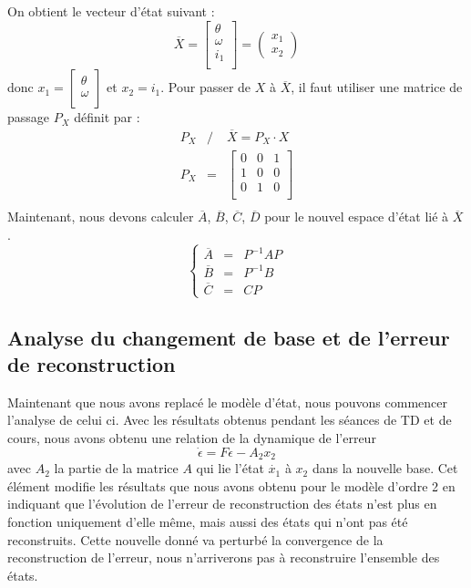 On obtient le vecteur d'état suivant : 
\begin{equation}
\overline{X} = \begin{bmatrix}
\theta\\
\omega\\
i_1\\
\end{bmatrix} = \begin{pmatrix}
x_1\\x_2
\end{pmatrix}
\end{equation}
donc $x_1 = \begin{bmatrix}
\theta\\
\omega\\ \end{bmatrix}$ et $x_2 = i_1$. Pour passer de $X$ à $\overline{X}$, il faut utiliser une matrice de passage $P_X$ définit par :
 \begin{eqnarray}
 P_X &/&  \overline{X} =P_X \cdot X \\
 P_X &=&\begin{bmatrix}
 0 & 0 & 1 \\
 1 & 0 & 0 \\
 0 & 1 & 0 \\
\end{bmatrix}  \\
 \end{eqnarray}
Maintenant, nous devons calculer $\overline{A}$, $\overline{B}$, $\overline{C}$, $\overline{D}$ pour le nouvel espace d'état lié à $\overline{X}$.
\begin{equation}%
	\left\lbrace%
	\begin{matrix}
		\overline{A} &=& P^{-1} A P \\%
		\overline{B} &=& P^{-1} B \\%
		\overline{C} &=& C P%
	\end{matrix}
\right.%
\end{equation}

\subsection{Analyse du changement de base et de l'erreur de reconstruction}
Maintenant que nous avons replacé le modèle d'état, nous pouvons commencer l'analyse de celui ci. Avec les résultats obtenus pendant les séances de TD et de cours, nous avons obtenu une relation de la dynamique de l'erreur \begin{equation}\label{eqn:erreurRecompoOrdreSup}
\dot{\epsilon} = F\epsilon - A_2x_2
\end{equation}
avec $A_2$ la partie de la matrice $A$ qui lie l'état $\dot{x_1}$ à $x_2$ dans la nouvelle base. Cet élément modifie les résultats que nous avons obtenu pour le modèle d'ordre 2 en indiquant que l'évolution de l'erreur de reconstruction des états n'est plus en fonction uniquement d'elle même, mais aussi des états qui n'ont pas été reconstruits. Cette nouvelle donné va perturbé la convergence de la reconstruction de l'erreur, nous n'arriverons pas à reconstruire l'ensemble des états. 


